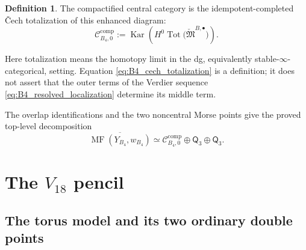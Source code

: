 \documentclass[11pt]{amsart}
\theoremstyle{definition}
\newtheorem{definition}[theorem]{Definition}
\theoremstyle{remark}
\DeclareMathOperator{\MF}{MF}
\DeclareMathOperator{\Tot}{Tot}
\DeclareMathOperator{\Kar}{Kar}
\newcommand{\MorseCat}[1]{\mathsf{Q}_{#1}}
\newcommand{\CcompB}{\mathcal C^{\mathrm{comp}}_{B_4,0}}
\begin{document}
\begin{definition}
\label{def:B4_comp_category}
The compactified central category is the idempotent-completed Čech
totalization of this enhanced diagram:
\begin{equation}
\label{eq:B4_cech_totalization}
\CcompB
:=
\Kar\!\left(
H^0\Tot\bigl(\check{\mathfrak M}^{B,\bullet}\bigr)
\right).
\end{equation}
\end{definition}

Here totalization means the homotopy limit in the dg, equivalently
stable-$\infty$-categorical, setting.  Equation
\eqref{eq:B4_cech_totalization} is a definition; it does not assert that the
outer terms of the Verdier sequence \eqref{eq:B4_resolved_localization}
determine its middle term.

The overlap identifications and the two noncentral Morse points give the
proved top-level decomposition
\begin{equation}
\label{eq:B4_final_decomposition}
\overline{\MF(Y_{B_4},w_{B_4})}
\simeq
\CcompB\oplus\MorseCat{3}\oplus\MorseCat{3}.
\end{equation}

\section{The \texorpdfstring{$V_{18}$}{V18} pencil}

\subsection{The torus model and its two ordinary double points}
\end{document}
